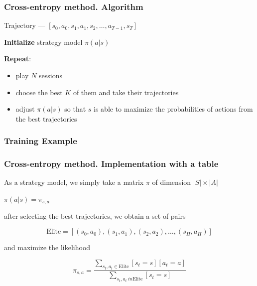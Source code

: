\documentclass[fullscreen=true, bookmarks=true, hyperref={pdfencoding=unicode}]{beamer}
\begin{document}

\begin{frame}
  \frametitle{Cross-entropy method. Algorithm}

    Trajectory — $\left[s_0, a_0, s_1, a_1, s_2, \dots , a_{T-1}, s_T \right]$

   \vspace{1cm}
   {\bf Initialize} strategy model $\pi(a | s)$

   \vspace{1cm}
   {\bf Repeat}:
   \begin{itemize}
     \item play $N$ sessions
     \item choose the best $K$ of them and take their trajectories
     \item adjust $\pi(a | s)$ so that $s$ is able to maximize the probabilities of actions from the best trajectories
   \end{itemize}
\end{frame}


\begin{frame}
  \frametitle{Training Example}

  \begin{center}
  \end{center}
\end{frame}


\begin{frame}
  \frametitle{Cross-entropy method. Implementation with a table}

    As a strategy model, we simply take a matrix $\pi$ of dimension $|S| \times |A|$

   $\pi(a | s) = \pi_{s,a}$

   after selecting the best trajectories, we obtain a set of pairs

   $$\text{Elite} = [(s_0, a_0), (s_1, a_1), (s_2, a_2), \dots, (s_H, a_H )]$$

   and maximize the likelihood

   $$ \pi_{s,a} = \frac{\sum\limits_{s_t, a_t \in \text{Elite}} [s_t = s][a_t = a]}{\sum\limits_{s_t, a_t \ in \text{Elite}} [s_t = s]}$$
\end{frame}
\end{document}
